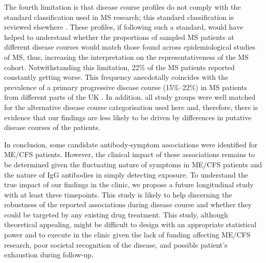 The fourth limitation is that disease course profiles do not comply with the standard classification used in MS research; this standard classification is reviewed elsewhere \citep{klineova2018ClinicalCourse}. These profiles, if following such a standard, would have helped to understand whether the proportions of sampled MS patients at different disease courses would match those found across epidemiological studies of MS, thus, increasing the interpretation on the representativeness of the MS cohort. Notwithstanding this limitation, 22\% of the MS patients reported constantly getting worse. This frequency anecdotally coincides with the prevalence of a primary progressive disease course (15\%--22\%) in MS patients from different parts of the UK \citep{pugliatti2006EpidemiologyMultiple}. In addition, all study groups were well matched for the alternative disease course categorisation used here and, therefore, there is evidence that our findings are less likely to be driven by differences in putative disease courses of the patients.

In conclusion, some candidate antibody-symptom associations were identified for ME/CFS patients. However, the clinical impact of these associations remains to be determined given the fluctuating nature of symptoms in ME/CFS patients and the nature of IgG antibodies in simply detecting exposure. To understand the true impact of our findings in the clinic, we propose a future longitudinal study with at least three timepoints. This study is likely to help discerning the robustness of the reported associations during disease course and whether they could be targeted by any existing drug treatment. This study, although theoretical appealing, might be difficult to design with an appropriate statistical power and to execute in the clinic given the lack of funding affecting ME/CFS research, poor societal recognition of the disease, and possible patient's exhaustion during follow-up.







